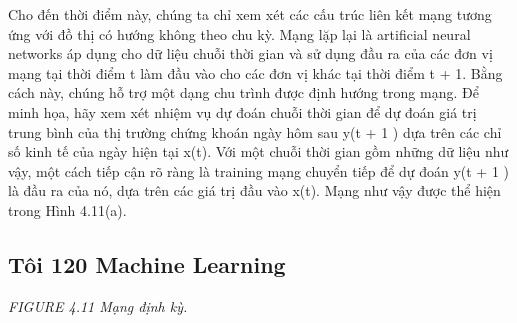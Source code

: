 Cho đến thời điểm này, chúng ta chỉ xem xét các cấu trúc liên kết mạng tương ứng với đồ thị có hướng không theo chu kỳ. Mạng lặp lại là artificial neural networks áp dụng cho dữ liệu chuỗi thời gian và sử dụng đầu ra của các đơn vị mạng tại thời điểm t làm đầu vào cho các đơn vị khác tại thời điểm t + 1. Bằng cách này, chúng hỗ trợ một dạng chu trình được định hướng trong mạng. Để minh họa, hãy xem xét nhiệm vụ dự đoán chuỗi thời gian để dự đoán giá trị trung bình của thị trường chứng khoán ngày hôm sau y(t + 1 ) dựa trên các chỉ số kinh tế của ngày hiện tại x(t). Với một chuỗi thời gian gồm những dữ liệu như vậy, một cách tiếp cận rõ ràng là training mạng chuyển tiếp để dự đoán y(t + 1 ) là đầu ra của nó, dựa trên các giá trị đầu vào x(t). Mạng như vậy được thể hiện trong Hình 4.11(a).

\subsection{Tôi 120 Machine Learning}

\noindent\textit{FIGURE 4.11 Mạng định kỳ.}

